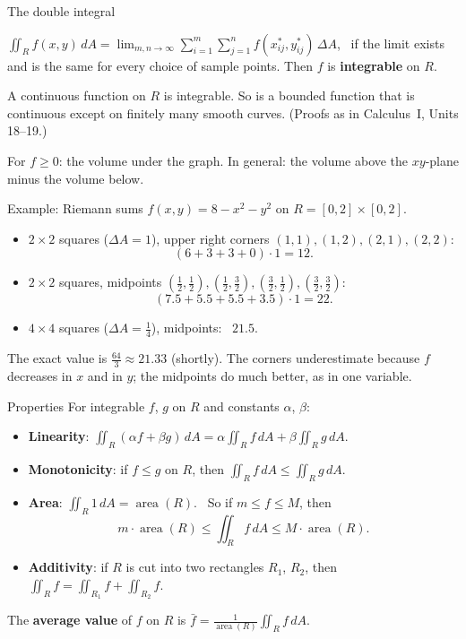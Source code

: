 \documentclass[10pt]{wosm-slides}
\newcommand{\dA}{\, dA}
\begin{document}
\begin{frame}{The double integral}
  \begin{definition}
    $\displaystyle \iint_R f(x, y) \dA = \lim_{m, n \to \infty} \sum_{i=1}^m \sum_{j=1}^n f(x_{ij}^*, y_{ij}^*)\, \Delta A$, \
    if the limit exists and is the same for every choice of sample points. Then $f$ is
    \textbf{integrable} on $R$.
  \end{definition}
  \pause
  \begin{theorem}
    A continuous function on $R$ is integrable. So is a bounded function that is continuous except on
    finitely many smooth curves. (Proofs as in Calculus~I, Units 18--19.)
  \end{theorem}
  \pause
  For $f \ge 0$: the volume under the graph. In general: the volume above the $xy$-plane minus the
  volume below.
\end{frame}

\begin{frame}{Example: Riemann sums}
  $f(x, y) = 8 - x^2 - y^2$ on $R = [0, 2] \times [0, 2]$.
  \pause
  \begin{itemize}
    \item $2 \times 2$ squares ($\Delta A = 1$), upper right corners $(1, 1), (1, 2), (2, 1), (2, 2)$:
      \[ (6 + 3 + 3 + 0) \cdot 1 = 12 . \]
    \pause
    \item $2 \times 2$ squares, midpoints $(\frac12, \frac12), (\frac12, \frac32), (\frac32, \frac12), (\frac32, \frac32)$:
      \[ (7.5 + 5.5 + 5.5 + 3.5) \cdot 1 = 22 . \]
    \pause
    \item $4 \times 4$ squares ($\Delta A = \frac14$), midpoints: \ $21.5$.
  \end{itemize}
  \pause
  The exact value is $\frac{64}{3} \approx 21.33$ (shortly). The corners underestimate because $f$
  decreases in $x$ and in $y$; the midpoints do much better, as in one variable.
\end{frame}

\begin{frame}{Properties}
  For integrable $f$, $g$ on $R$ and constants $\alpha$, $\beta$:
  \begin{itemize}
    \item \textbf{Linearity}: $\iint_R (\alpha f + \beta g) \dA = \alpha \iint_R f \dA + \beta \iint_R g \dA$.
    \item \textbf{Monotonicity}: if $f \le g$ on $R$, then $\iint_R f \dA \le \iint_R g \dA$.
    \item \textbf{Area}: $\iint_R 1 \dA = \operatorname{area}(R)$. \ So if $m \le f \le M$, then
      \[ m \cdot \operatorname{area}(R) \le \iint_R f \dA \le M \cdot \operatorname{area}(R) . \]
    \item \textbf{Additivity}: if $R$ is cut into two rectangles $R_1$, $R_2$, then
      $\iint_R f = \iint_{R_1} f + \iint_{R_2} f$.
  \end{itemize}
  \pause
  The \textbf{average value} of $f$ on $R$ is $\displaystyle \bar f = \frac{1}{\operatorname{area}(R)} \iint_R f \dA$.
\end{frame}
\end{document}
